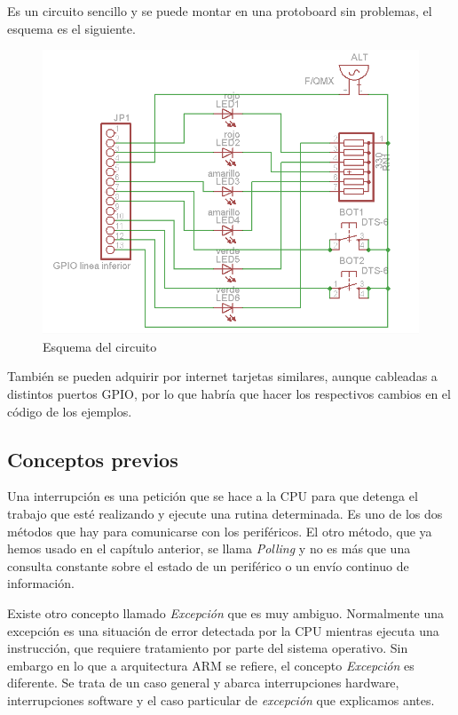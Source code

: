 Es un circuito sencillo y se puede montar en una protoboard sin
problemas, el esquema es el siguiente.

\begin{figure}[h]
  \centering
    \includegraphics[width=14cm]{graphs/circuito.png}
  \caption{Esquema del circuito}
  \label{fig:circuito}
\end{figure}

También se pueden adquirir por internet tarjetas similares, aunque cableadas
a distintos puertos GPIO, por lo que habría que hacer los respectivos cambios
en el código de los ejemplos.

\subsection{Conceptos previos}

Una interrupción es una petición que se hace a la CPU para que detenga el
trabajo que esté realizando y ejecute una rutina determinada. Es uno de los
dos métodos que hay para comunicarse con los periféricos. El otro método,
que ya hemos usado en el capítulo anterior, se llama {\it Polling} y no es
más que una consulta constante sobre el estado de un periférico o un envío
continuo de información.

Existe otro concepto llamado {\it Excepción} que es muy ambiguo. Normalmente
una excepción es una situación de error detectada por la CPU mientras ejecuta
una instrucción, que requiere tratamiento por parte del sistema operativo.
Sin embargo en lo que a arquitectura ARM se refiere, el concepto {\it Excepción}
es diferente. Se trata de un caso general y abarca interrupciones hardware,
interrupciones software y el caso particular de {\it excepción} que explicamos
antes.

